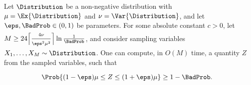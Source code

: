 \begin{theorem}
    Let $\Distribution$ be a non-negative distribution with
    $\mu = \Ex{\Distribution}$ and $\nu = \Var{\Distribution}$, and
    let $\eps, \BadProb \in (0,1)$ be parameters.  For some absolute
    constant $c >0$, let
    $M \geq 24 \Bigl\lceil{ \frac{4 \nu\bigr.}{\eps^2\mu^2\bigr.}  }
    \Bigr\rceil \ln \frac{1}{\BadProb}$, and consider sampling
    variables $X_1, \ldots, X_M \sim \Distribution$. One can compute,
    in $O(M)$ time, a quantity $Z$ from the sampled variables, such
    that
    \begin{equation*}
        \Prob{ (1-\eps)\mu \leq Z \leq (1+\eps)\mu \Bigr.} \geq 1 -
        \BadProb.
    \end{equation*}
\end{theorem}
